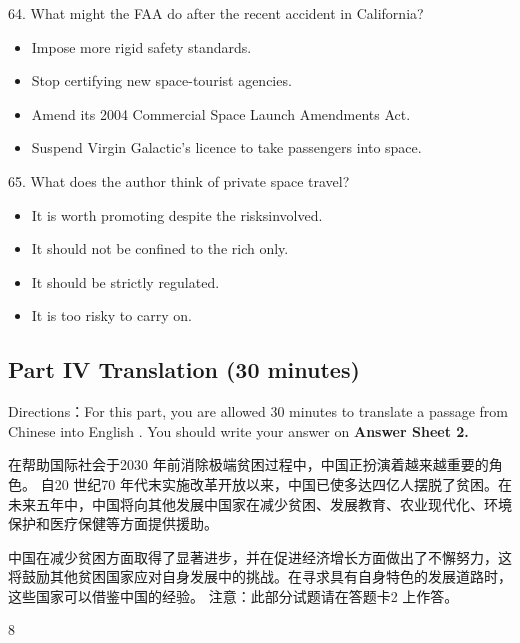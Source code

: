 \documentclass[UTF8,11pt]{ctexart}
\begin{document}
64. What might the FAA do after the recent accident in California?


\begin{itemize}[leftmargin=2em,itemsep=.2em,topsep=.4em]\item[A.] Impose more rigid safety standards.
\item[B.] Stop certifying new space-tourist agencies.
\item[C.] Amend its 2004 Commercial Space Launch Amendments Act.
\item[D.] Suspend Virgin Galactic’s licence to take passengers into space.
\end{itemize}

65. What does the author think of private space travel?


\begin{itemize}[leftmargin=2em,itemsep=.2em,topsep=.4em]\item[A.] It is worth promoting despite the risksinvolved.
\item[B.] It should not be confined to the rich only.
\item[C.] It should be strictly regulated.
\item[D.] It is too risky to carry on.
\end{itemize}

\subsection*{\textbf{Part} IV \textbf{Translation} \textbf{(30 minutes)}}


Directions：For this part, you are allowed 30 minutes to translate a passage from Chinese into English . You should write your answer on\textbf{ Answer Sheet 2.}


在帮助国际社会于2030 年前消除极端贫困过程中，中国正扮演着越来越重要的角色。 自20 世纪70 年代末实施改革开放以来，中国已使多达四亿人摆脱了贫困。在未来五年中，中国将向其他发展中国家在减少贫困、发展教育、农业现代化、环境保护和医疗保健等方面提供援助。


中国在减少贫困方面取得了显著进步，并在促进经济增长方面做出了不懈努力，这将鼓励其他贫困国家应对自身发展中的挑战。在寻求具有自身特色的发展道路时，这些国家可以借鉴中国的经验。 注意：此部分试题请在答题卡2 上作答。


8
\end{document}
